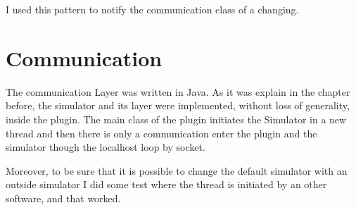 I used this pattern to notify the communication class of a changing.

\section{Communication}



The communication Layer was written in Java. As it was explain in the chapter before, the simulator and its layer were implemented, without loss of generality, inside the plugin. The main class of the plugin initiates the Simulator in a new thread and then there is only a communication enter the plugin and the simulator though the localhost loop by socket.


Moreover, to be sure that it is possible to change the default simulator with an outside simulator I did some test where the thread is initiated by an other software, and that worked. %






